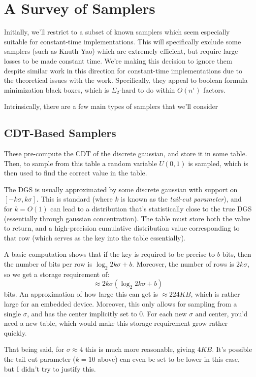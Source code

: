\documentclass{article}
\begin{document}
\section{A Survey of Samplers}
Initially, we'll restrict to a subset of known samplers which seem especially suitable for constant-time implementations.
This will specifically exclude some samplers (such as Knuth-Yao) which are extremely efficient, but require large losses to be made constant time.
We're making this decision to ignore them despite similar work in this direction for constant-time implementations due to the theoretical issues with the work.
Specifically, they appeal to boolean formula minimization black boxes, which is $\Sigma_2$-hard to do within $O(n^\epsilon)$ factors.

Intrinsically, there are a few main types of samplers that we'll consider
\subsection{CDT-Based Samplers}
These pre-compute the CDT of the discrete gaussian, and store it in some table.
Then, to sample from this table a random variable $U(0,1)$ is sampled, which is then used to find the correct value in the table.

The DGS is usually approximated by some discrete gaussian with support on $[-k\sigma, k\sigma]$.
This is standard (where $k$ is known as the \emph{tail-cut parameter}), and for $k = O(1)$ can lead to a distribution that's statistically close to the true DGS (essentially through gaussian concentration).
The table must store both the value to return, and a high-precision cumulative distribution value corresponding to that row (which serves as the key into the table essentially).

A basic computation shows that if the key is required to be precise to $b$ bits, then the number of bits per row is $\log_2 2k\sigma + b$.
Moreover, the number of rows is $2k\sigma$, so we get a storage requirement of:
\begin{equation}
\approx 2k\sigma (\log_2 2k\sigma + b)
\end{equation}
bits. 
An approximation of how large this can get is $\approx 224KB$, which is rather large for an embedded device.
Moreover, this only allows for sampling from a single $\sigma$, and has the center implicitly set to $0$.
For each new $\sigma$ and center, you'd need a new table, which would make this storage requirement grow rather quickly.

That being said, for $\sigma\approx 4$ this is much more reasonable, giving $4KB$.
It's possible the tail-cut parameter ($k = 10$ above) can even be set to be lower in this case, but I didn't try to justify this.
\end{document}
